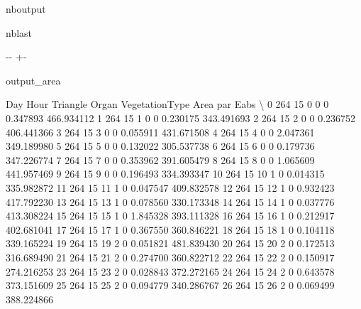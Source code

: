 \documentclass[letterpaper,10pt,english]{sphinxmanual}
\begin{document}
\begin{sphinxuseclass}{nboutput}
\begin{sphinxuseclass}{nblast}
{

\kern-\sphinxverbatimsmallskipamount\kern-\baselineskip
\kern+\FrameHeightAdjust\kern-\fboxrule
\vspace{\nbsphinxcodecellspacing}

\begin{sphinxuseclass}{output_area}
\begin{sphinxuseclass}{}


\begin{sphinxVerbatim}[commandchars=\\\{\}]
    Day  Hour  Triangle  Organ  VegetationType      Area    par Eabs  \textbackslash{}
0   264    15         0      0               0  0.347893  466.934112
1   264    15         1      0               0  0.230175  343.491693
2   264    15         2      0               0  0.236752  406.441366
3   264    15         3      0               0  0.055911  431.671508
4   264    15         4      0               0  2.047361  349.189980
5   264    15         5      0               0  0.132022  305.537738
6   264    15         6      0               0  0.179736  347.226774
7   264    15         7      0               0  0.353962  391.605479
8   264    15         8      0               0  1.065609  441.957469
9   264    15         9      0               0  0.196493  334.393347
10  264    15        10      1               0  0.014315  335.982872
11  264    15        11      1               0  0.047547  409.832578
12  264    15        12      1               0  0.932423  417.792230
13  264    15        13      1               0  0.078560  330.173348
14  264    15        14      1               0  0.037776  413.308224
15  264    15        15      1               0  1.845328  393.111328
16  264    15        16      1               0  0.212917  402.681041
17  264    15        17      1               0  0.367550  360.846221
18  264    15        18      1               0  0.104118  339.165224
19  264    15        19      2               0  0.051821  481.839430
20  264    15        20      2               0  0.172513  316.689490
21  264    15        21      2               0  0.274700  360.822712
22  264    15        22      2               0  0.150917  274.216253
23  264    15        23      2               0  0.028843  372.272165
24  264    15        24      2               0  0.643578  373.151609
25  264    15        25      2               0  0.094779  340.286767
26  264    15        26      2               0  0.069499  388.224866


\end{sphinxVerbatim}
\end{sphinxuseclass}
\end{sphinxuseclass}}
\end{sphinxuseclass}
\end{sphinxuseclass}
\end{document}
